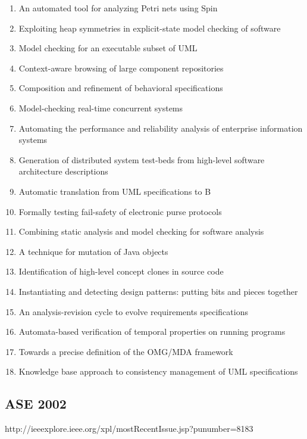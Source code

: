 \begin{enumerate}[itemsep=-1ex]
  \item An automated tool for analyzing Petri nets using Spin
  \item Exploiting heap symmetries in explicit-state model checking of software
  \item Model checking for an executable subset of UML
  \item Context-aware browsing of large component repositories
  \item Composition and refinement of behavioral specifications
  \item Model-checking real-time concurrent systems
  \item Automating the performance and reliability analysis of enterprise information systems
  \item Generation of distributed system test-beds from high-level software architecture descriptions
  \item Automatic translation from UML specifications to B
  \item Formally testing fail-safety of electronic purse protocols
  \item Combining static analysis and model checking for software analysis
  \item A technique for mutation of Java objects
  \item Identification of high-level concept clones in source code
  \item Instantiating and detecting design patterns: putting bits and pieces together
  \item An analysis-revision cycle to evolve requirements specifications
  \item Automata-based verification of temporal properties on running programs
  \item Towards a precise definition of the OMG/MDA framework
  \item Knowledge base approach to consistency management of UML specifications 
\end{enumerate}

\subsection{ASE 2002}

http://ieeexplore.ieee.org/xpl/mostRecentIssue.jsp?punumber=8183

